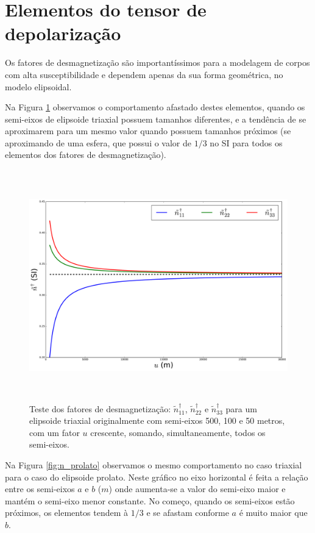 \section{Elementos do tensor de depolarização}

Os fatores de desmagnetização são importantíssimos para a modelagem de corpos com alta susceptibilidade e dependem apenas da sua forma geométrica, no modelo elipsoidal. 

Na Figura \ref{fig:n_triaxial} observamos o comportamento afastado destes elementos, quando os semi-eixos de elipsoide triaxial possuem tamanhos diferentes, e a tendência de se aproximarem para um mesmo valor quando possuem tamanhos próximos (se aproximando de uma esfera, que possui o valor de $1/3$ no SI para todos os elementos dos fatores de desmagnetização).


\begin{figure}[hbt!]
	\centering \includegraphics[width=15cm,height=10cm]{figures/test_n_triaxial}
	\caption[Teste dos fatores de desmagnetização para um elipsoide triaxial.]{Teste dos fatores de desmagnetização:
		$\tilde{n}^{\dagger}_{11}$, $\tilde{n}^{\dagger}_{22}$ e $\tilde{n}^{\dagger}_{33}$ 
		para um elipsoide triaxial originalmente com semi-eixos 500, 100 e 50 metros, com um fator $u$ crescente,
		somando, simultaneamente, todos os semi-eixos.}
	\label{fig:n_triaxial}
\end{figure}

Na Figura \ref{fig:n_prolato} observamos o mesmo comportamento no caso triaxial para o caso do elipsoide prolato. Neste gráfico no eixo horizontal é feita a relação entre os semi-eixos $a$ e $b$ ($m$) onde aumenta-se a valor do semi-eixo maior e mantém o semi-eixo menor constante. No começo, quando os semi-eixos estão próximos, os elementos tendem à $1/3$ e se afastam conforme $a$ é muito maior que $b$.
\newpage


